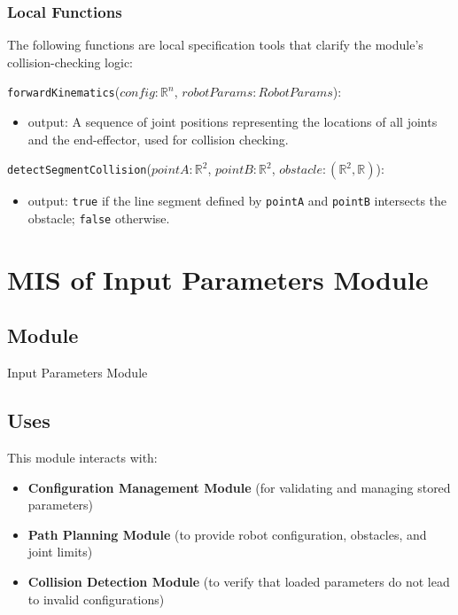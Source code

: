 \documentclass[12pt, titlepage]{article}
\begin{document}
\subsubsection{Local Functions}

The following functions are local specification tools that clarify the module's collision-checking logic:

\noindent \texttt{forwardKinematics}($config: \mathbb{R}^n$, $robotParams: RobotParams$):
\begin{itemize}
  \item output: A sequence of joint positions representing the locations of all joints and the end-effector, used for collision checking.
\end{itemize}

\noindent \texttt{detectSegmentCollision}($pointA: \mathbb{R}^2$, $pointB: \mathbb{R}^2$, $obstacle: (\mathbb{R}^2, \mathbb{R})$):
\begin{itemize}
  \item output: \texttt{true} if the line segment defined by \texttt{pointA} and \texttt{pointB} intersects the obstacle; \texttt{false} otherwise.
\end{itemize}



\newpage

\section{MIS of Input Parameters Module} \label{Module:InputParameters}

\subsection{Module}

Input Parameters Module

\subsection{Uses}

This module interacts with:
\begin{itemize}
    \item \textbf{Configuration Management Module} (for validating and managing stored parameters)
    \item \textbf{Path Planning Module} (to provide robot configuration, obstacles, and joint limits)
    \item \textbf{Collision Detection Module} (to verify that loaded parameters do not lead to invalid configurations)
\end{itemize}
\end{document}
